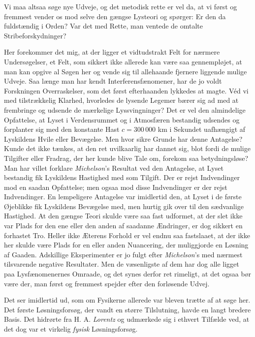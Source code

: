 \documentclass[12pt,a4paper]{article}
\newcommand{\opage}[1]{\marginnote{\footnotesize\textit{[#1]}}}
\begin{document}
Vi maa altsaa søge nye Udveje, og det metodisk rette er vel da, at vi først og
fremmest vender os mod selve den gængse Lysteori og spørger: Er den da
fuldstændig i Orden? Var det med Rette, man ventede de omtalte
Stribeforskydninger?

Her forekommer det mig, at der ligger et vidtudstrakt Felt for nærmere
Undersøgelser, et Felt, som sikkert ikke allerede kan være saa gennempløjet,
at man kan opgive al Søgen her og vende sig til allehaande fjernere liggende
mulige Udveje. Saa længe man har kendt Interferensfænomener, har de jo voldt
Forskningen Overraskelser, som det først efterhaanden lykkedes at magte. Véd
vi med tilstrækkelig Klarhed, hvorledes de lysende Legemer bærer sig ad med at
frembringe og udsende de mærkelige Lyssvingninger? Det er vel den almindelige
Opfattelse, at Lyset i Verdensrummet og i Atmosfæren bestandig udsendes og
forplanter sig med den konstante Hast $c = 300\,000$ km i Sekundet uafhængigt
af Lyskildens Hvile eller Bevægelse. Men hvor sikre Grunde har denne
Antagelse? Kunde det ikke tænkes, at den ret uvilkaarlig har dannet sig, blot
fordi de mulige Tilgifter eller Fradrag, der her kunde blive Tale om, forekom
saa betydningsløse? Man har villet forklare \emph{Michelson}'s Resultat ved
den Antagelse, at Lyset bestandig fik Lyskildens Hastighed med som Tilgift.
Der er rejst Indvendinger mod en saadan Opfattelse; men ogsaa mod disse
Indvendinger er der rejst Indvendinger. En lempeligere Antagelse var
imidlertid den, at Lyset i de første Øjeblikke fik Lyskildens Bevægelse med,
men hurtig gik over til den sædvanlige Hastighed. At den gængse Teori skulde
være saa fast udformet, at der slet ikke var Plads for den ene eller den anden
af saadanne Ændringer, er dog sikkert en forhastet Tro. Heller ikke Æterens
Forhold er vel endnu saa fastslaaet, at der ikke her skulde være Plads for en
eller anden Nuancering, der muliggjorde en Løsning af Gaaden. Adskillige
Eksperimenter er jo fulgt efter \emph{Michelson}'s med nærmest tilsvarende
negative Resultater. Men de væsenligste af dem har dog alle ligget paa
Lysfænomenernes Omraade, og det synes derfor ret rimeligt, at det ogsaa bør
være der, man først og fremmest spejder efter den forløsende Udvej.

Det ser imidlertid ud, som om Fysikerne allerede var bleven trætte af at søge
her. Det første Løsningsforsøg, der vandt en større
\opage{8} Tilslutning, havde en langt bredere Basis. Det hidrørte fra H. A.
\emph{Lorentz} og udmærkede sig i ethvert Tilfælde ved, at det dog var et
virkelig \emph{fysisk} Løsningsforsøg.
\end{document}
